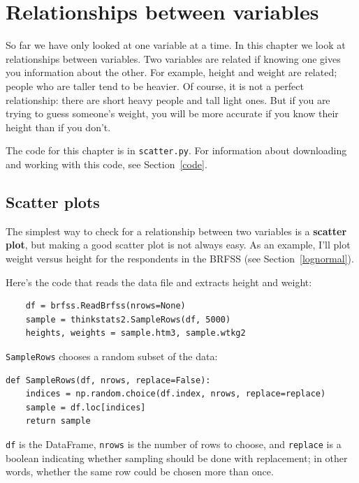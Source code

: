 \documentclass[12pt]{book}
\begin{document}
\chapter{Relationships between variables}

So far we have only looked at one variable at a time.  In this
chapter we look at relationships between variables.  Two variables are
related if knowing one gives you information about the other.  For
example, height and weight are related; people who are taller tend to
be heavier.  Of course, it is not a perfect relationship: there
are short heavy people and tall light ones.  But if you are
trying to guess someone's weight, you will be more accurate if you
know their height than if you don't.

The code for this chapter is in \verb"scatter.py".
For information about downloading and
working with this code, see Section~\ref{code}.


\section{Scatter plots}

The simplest way to check for a relationship between two variables
is a {\bf scatter plot}, but making a good scatter plot is not always easy.
As an example, I'll plot weight versus height for the respondents
in the BRFSS (see Section~\ref{lognormal}).

Here's the code that reads the data file and extracts height and
weight:

\begin{verbatim}
    df = brfss.ReadBrfss(nrows=None)
    sample = thinkstats2.SampleRows(df, 5000)
    heights, weights = sample.htm3, sample.wtkg2
\end{verbatim}

\verb"SampleRows" chooses a random subset of the data:

\begin{verbatim}
def SampleRows(df, nrows, replace=False):
    indices = np.random.choice(df.index, nrows, replace=replace)
    sample = df.loc[indices]
    return sample
\end{verbatim}

\verb"df" is the DataFrame, \verb"nrows" is the number of rows to choose,
and \verb"replace" is a boolean indicating whether sampling should be
done with replacement; in other words, whether the same row could be
chosen more than once.
\end{document}
